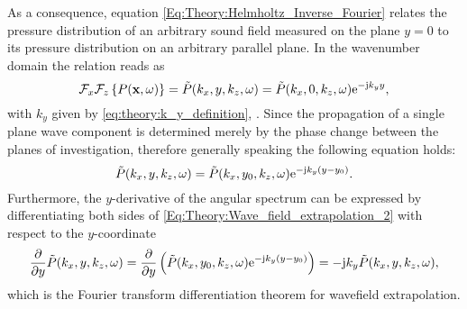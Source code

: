 As a consequence, equation \eqref{Eq:Theory:Helmholtz_Inverse_Fourier} relates the pressure distribution of an arbitrary sound field measured on the plane $y=0$ to its pressure distribution on an arbitrary parallel plane. 
In the wavenumber domain the relation reads as
\begin{equation}
\mathcal{F}_x\mathcal{F}_z \left\{ P(\mathbf{x},\omega) \right\} = \tilde{P}(k_x,y,k_z,\omega) = \tilde{P}(k_x,0,k_z,\omega) \mathrm{e}^{-\mathrm{j} k_y y},
\label{Eq:Theory:Wave_field_extrapolation}
\end{equation}
with $k_y$ given by \eqref{eq:theory:k_y_definition}, .
Since the propagation of a single plane wave component is determined merely by the phase change between the planes of investigation, therefore generally speaking the following equation holds:
\begin{equation}
\tilde{P}(k_x,y,k_z,\omega) = \tilde{P}(k_x,y_0,k_z,\omega) \mathrm{e}^{-\mathrm{j} k_y ( y - y_0 ) }.
\label{Eq:Theory:Wave_field_extrapolation_2}
\end{equation}
Furthermore, the $y$-derivative of the angular spectrum can be expressed by differentiating both sides of \eqref{Eq:Theory:Wave_field_extrapolation_2} with respect to the $y$-coordinate
\begin{equation}
\frac{\partial}{\partial y} \tilde{P}(k_x,y,k_z,\omega) = \frac{\partial}{\partial y} \left( \tilde{P}(k_x,y_0,k_z,\omega) \mathrm{e}^{-\mathrm{j} k_y ( y - y_0 ) } \right) = -\mathrm{j} k_y \tilde{P}(k_x,y,k_z,\omega),
\label{eq:Theory:Fourier_diff}
\end{equation}
which is the Fourier transform differentiation theorem for wavefield extrapolation.

